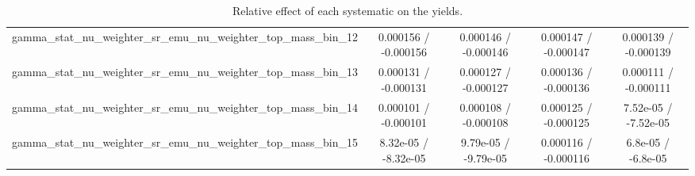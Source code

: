 \documentclass[10pt]{article}
\begin{document}
\begin{table}[htbp]
\begin{center}
\begin{tabular}{|c|c|c|c|c|}
  gamma_stat_nu_weighter_sr_emu_nu_weighter_top_mass_bin_12 & 0.000156 / -0.000156 & 0.000146 / -0.000146 & 0.000147 / -0.000147 & 0.000139 / -0.000139 \\ 
  gamma_stat_nu_weighter_sr_emu_nu_weighter_top_mass_bin_13 & 0.000131 / -0.000131 & 0.000127 / -0.000127 & 0.000136 / -0.000136 & 0.000111 / -0.000111 \\ 
  gamma_stat_nu_weighter_sr_emu_nu_weighter_top_mass_bin_14 & 0.000101 / -0.000101 & 0.000108 / -0.000108 & 0.000125 / -0.000125 & 7.52e-05 / -7.52e-05 \\ 
  gamma_stat_nu_weighter_sr_emu_nu_weighter_top_mass_bin_15 & 8.32e-05 / -8.32e-05 & 9.79e-05 / -9.79e-05 & 0.000116 / -0.000116 & 6.8e-05 / -6.8e-05 \\ 
\hline 
\end{tabular} 
\caption{Relative effect of each systematic on the yields.} 
\end{center} 
\end{table} 
\end{document}
